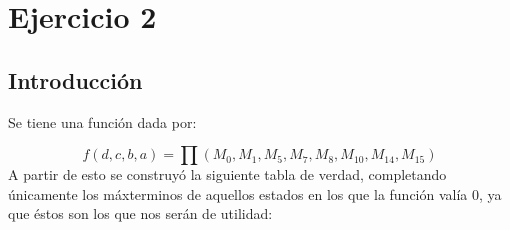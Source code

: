 
\section{Ejercicio 2}
\subsection{Introducción}
\newcommand\Tstrut{\rule{0pt}{2.4ex}}
Se tiene una función dada por:

\[
	f(d,c,b,a)=\prod\left(M_{0},M_{1},M_{5},M_{7},M_{8},M_{10},M_{14},M_{15}\right)
\]
\vspace{5mm}
A partir de esto se construyó la siguiente tabla de verdad, completando únicamente los máxterminos de aquellos estados en los que la función valía 0, ya que éstos son los que nos serán de utilidad:

